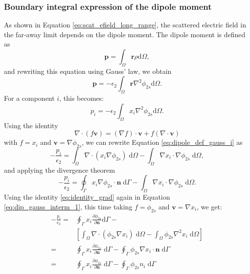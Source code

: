 \subsubsection{Boundary integral expression of the dipole moment}

As shown in Equation \eqref{eq:scat_efield_long_range}, the scattered electric 
field in the far-away limit depends on the dipole moment. The dipole moment is 
defined as 
%
\begin{equation} \label{eq:dipole_def}
\mathbf{p} = \int_\Omega \mathbf{r} \rho \text{d}\Omega,
\end{equation}
%
and rewriting this equation using Gauss' law, we obtain
%
\begin{equation} \label{eq:dipole_def_gauss}
\mathbf{p} = -\epsilon_2\int_\Omega \mathbf{r} \nabla^2 \phi_{2s} \text{d}\Omega.
\end{equation}
%
For a component $i$, this becomes:
%
\begin{equation} \label{eq:dipole_def_gauss_i}
{p_i} = -\epsilon_2\int_\Omega {x_i} \nabla^2 \phi_{2s} \text{d}\Omega.
\end{equation}
%
Using the identity
%
\begin{equation} \label{eq:identity_grad}
  \nabla \cdot \left(f \mathbf{v}\right) = \left( \nabla f \right)\cdot \mathbf{v} + f\left(\nabla \cdot \mathbf{v}\right)
\end{equation}
%
with $f=x_i$ and $\mathbf{v} = \nabla\phi_{2s}$, we can rewrite Equation \eqref{eq:dipole_def_gauss_i}
as 
%
\begin{equation}
- \frac{p_i}{\epsilon_2} = \int_\Omega \nabla \cdot \left( x_i \nabla \phi_{2s} \right) \; \text{d}\Omega - \int_\Omega \nabla x_i \cdot \nabla\phi_{2s} \; \text{d}\Omega, \nonumber 
\end{equation}
 and applying the divergence theorem
\begin{equation} \label{eq:dip_gauss_interm_1}
- \frac{p_i}{\epsilon_2}= \oint_\Gamma  x_i  \nabla \phi_{2s} \cdot \mathbf{n} \; \text{d}\Gamma - \int_\Omega \nabla x_i \cdot \nabla\phi_{2s} \; \text{d}\Omega.
\end{equation}
%
Using the identity \eqref{eq:identity_grad} again in Equation \eqref{eq:dip_gauss_interm_1}, this time 
taking $f=\phi_{2s}$ and $\mathbf{v} = \nabla x_i$, we get:
%
\begin{align} \label{eq:dip_gauss_interm_2}
 - \frac{p_i}{\epsilon_2} =& \oint_\Gamma  x_i  \frac{\partial \phi_{2s}}{\partial \mathbf{n}} \text{d}\Gamma - \nonumber \\
 & \left[ \int_\Omega \nabla \cdot \left( \phi_{2s} \nabla x_i \right)\;\text{d}\Omega - \int_\Omega  \phi_{2s} \nabla^2 x_i \;\text{d}\Omega\right] \nonumber\\
=& \oint_\Gamma  x_i  \frac{\partial \phi_{2s}}{\partial \mathbf{n}} \; \text{d}\Gamma - \oint_\Gamma \phi_{2s} \nabla x_i \cdot \mathbf{n} \; \text{d}\Gamma \nonumber \\
=& \oint_\Gamma  x_i  \frac{\partial \phi_{2s}}{\partial \mathbf{n}} \; \text{d}\Gamma - \oint_\Gamma \phi_{2s} n_i \;\text{d}\Gamma
\end{align}
